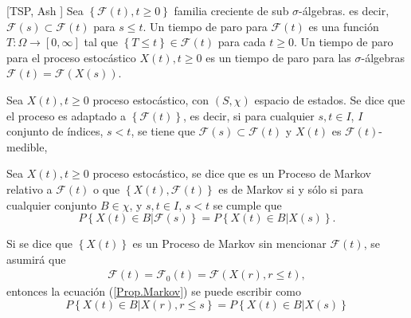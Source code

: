 \begin{Def}\label{Def.Tiempo.Paro}[TSP, Ash \cite{RBA}]
Sea $\left\{\mathcal{F}\left(t\right),t\geq0\right\}$ familia
creciente de sub $\sigma$-\'algebras. es decir,
$\mathcal{F}\left(s\right)\subset\mathcal{F}\left(t\right)$ para
$s\leq t$. Un tiempo de paro para $\mathcal{F}\left(t\right)$ es
una funci\'on $T:\Omega\rightarrow\left[0,\infty\right]$ tal que
$\left\{T\leq t\right\}\in\mathcal{F}\left(t\right)$ para cada
$t\geq0$. Un tiempo de paro para el proceso estoc\'astico
$X\left(t\right),t\geq0$ es un tiempo de paro para las
$\sigma$-\'algebras
$\mathcal{F}\left(t\right)=\mathcal{F}\left(X\left(s\right)\right)$.
\end{Def}

\begin{Def}
Sea $X\left(t\right),t\geq0$ proceso estoc\'astico, con
$\left(S,\chi\right)$ espacio de estados. Se dice que el proceso
es adaptado a $\left\{\mathcal{F}\left(t\right)\right\}$, es
decir, si para cualquier $s,t\in I$, $I$ conjunto de \'indices,
$s<t$, se tiene que
$\mathcal{F}\left(s\right)\subset\mathcal{F}\left(t\right)$ y
$X\left(t\right)$ es $\mathcal{F}\left(t\right)$-medible,
\end{Def}

\begin{Def}
Sea $X\left(t\right),t\geq0$ proceso estoc\'astico, se dice que es
un Proceso de Markov relativo a $\mathcal{F}\left(t\right)$ o que
$\left\{X\left(t\right),\mathcal{F}\left(t\right)\right\}$ es de
Markov si y s\'olo si para cualquier conjunto $B\in\chi$,  y
$s,t\in I$, $s<t$ se cumple que
\begin{equation}\label{Prop.Markov}
P\left\{X\left(t\right)\in
B|\mathcal{F}\left(s\right)\right\}=P\left\{X\left(t\right)\in
B|X\left(s\right)\right\}.
\end{equation}
\end{Def}
\begin{Note}
Si se dice que $\left\{X\left(t\right)\right\}$ es un Proceso de
Markov sin mencionar $\mathcal{F}\left(t\right)$, se asumir\'a que
\begin{eqnarray*}
\mathcal{F}\left(t\right)=\mathcal{F}_{0}\left(t\right)=\mathcal{F}\left(X\left(r\right),r\leq
t\right),
\end{eqnarray*}
entonces la ecuaci\'on (\ref{Prop.Markov}) se puede escribir como
\begin{equation}
P\left\{X\left(t\right)\in B|X\left(r\right),r\leq s\right\} =
P\left\{X\left(t\right)\in B|X\left(s\right)\right\}
\end{equation}
\end{Note}


